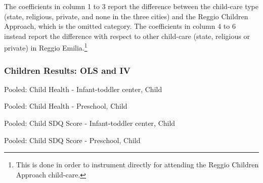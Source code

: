 \begin{table}[H]
\begin{table}[H]
\begin{table}[H]
\begin{table}[H]
\begin{table}[H]
\begin{table}[H]
The coefficients in column 1 to 3 report the difference between the child-care type (state, religious, private, and none in the three cities) and the Reggio Children Approach, which is the omitted category. The coefficients in column 4 to 6 instead report the difference with respect to other child-care (state, religious or private) in Reggio Emilia.\footnote{This is done in order to instrument directly for attending the Reggio Children Approach child-care.}

\singlespacing
\setlength\tabcolsep{0.25em}
\subsubsection{Children Results: OLS and IV}
\begin{small}
\begin{table}[H]
\caption{Pooled: Child Health - Infant-toddler center, Child}
  
\end{table}
\begin{table}[H]
\caption{Pooled: Child Health - Preschool, Child}

\end{table}

\begin{table}[H]
\caption{Pooled: Child SDQ Score - Infant-toddler center, Child}
  
\end{table}
\begin{table}[H]
\caption{Pooled: Child SDQ Score - Preschool, Child}

\end{table}


\end{small}
\end{table}
\end{table}
\end{table}
\end{table}
\end{table}
\end{table}
